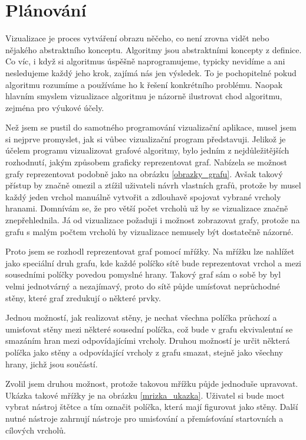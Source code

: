 \documentclass[12pt]{report}			%
\begin{document}

		\chapter{Plánování}
			Vizualizace je proces vytváření obrazu něčeho, co není zrovna vidět nebo nějakého abstraktního konceptu. Algoritmy jsou abstraktními koncepty z definice. Co víc, i když si algoritmus úspěšně naprogramujeme, typicky nevidíme a ani nesledujeme každý jeho krok, zajímá nás jen výsledek. To je pochopitelné pokud algoritmu rozumíme a používáme ho k řešení konkrétního problému. Naopak hlavním smyslem vizualizace algoritmu je názorně ilustrovat chod algoritmu, zejména pro výukové účely.
			
			Než jsem se pustil do samotného programování vizualizační aplikace, musel jsem si nejprve promyslet, jak si vůbec vizualizační program představuji. 
			Jelikož je účelem programu vizualizovat grafové algoritmy, bylo jedním z nejdůležitějších rozhodnutí, jakým způsobem graficky reprezentovat graf. Nabízela se možnost grafy reprezentovat podobně jako na obrázku \ref{obrazky_grafu}. Avšak takový přístup by značně omezil a ztížil uživateli návrh vlastních grafů, protože by musel každý jeden vrchol manuálně vytvořit a zdlouhavě spojovat vybrané vrcholy hranami. Domnívám se, že pro větší počet vrcholů už by se vizualizace značně znepřehlednila. Já od vizualizace požaduji i možnost zobrazovat  grafy, protože na grafu s malým počtem vrcholů by vizualizace nemusely být dostatečně názorné.
			
			Proto jsem se rozhodl reprezentovat graf pomocí mřížky. Na mřížku lze nahlížet jako speciální druh grafu, kde každé políčko sítě bude reprezentovat vrchol a mezi sousedními políčky povedou pomyslné hrany. Takový graf sám o sobě by byl velmi jednotvárný a nezajímavý, proto do sítě půjde umísťovat neprůchodné stěny, které graf zredukují o některé prvky. 
			
			Jednou možností, jak realizovat stěny, je nechat všechna políčka průchozí a umisťovat stěny mezi některé sousední políčka, což bude v grafu ekvivalentní se smazáním hran mezi odpovídajícími vrcholy. Druhou možností je určit některá políčka jako stěny a odpovídající vrcholy z grafu smazat, stejně jako všechny hrany, jichž jsou součástí. 
			
			Zvolil jsem druhou možnost, protože takovou mřížku půjde jednoduše upravovat. Ukázka takové mřížky je na obrázku \ref{mrizka_ukazka}. Uživatel si bude moct vybrat nástroj štětce a tím označit políčka, která mají figurovat jako stěny. Další nutné nástroje zahrnují nástroje pro umisťování a přemísťování startovních a cílových vrcholů. 
			
\end{document}

